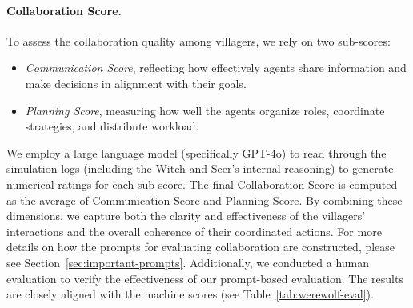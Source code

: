 \paragraph{Collaboration Score.}
To assess the collaboration quality among villagers, we rely on two sub-scores:
\begin{itemize}
    \item \emph{Communication Score}, reflecting how effectively agents share information and make decisions in alignment with their goals.
    \item \emph{Planning Score}, measuring how well the agents organize roles, coordinate strategies, and distribute workload.
\end{itemize}
We employ a large language model (specifically GPT-4o) to read through the simulation logs 
(including the Witch and Seer’s internal reasoning) to generate numerical ratings 
for each sub-score. The final Collaboration Score is computed as the average 
of Communication Score and Planning Score. By combining these dimensions, 
we capture both the clarity and effectiveness of the villagers’ interactions 
and the overall coherence of their coordinated actions.
For more details on how the prompts for evaluating collaboration are constructed,
please see Section~\ref{sec:important-prompts}.
Additionally, we conducted a human evaluation to verify the effectiveness of our prompt-based evaluation. The results are closely aligned with the machine scores (see Table~\ref{tab:werewolf-eval}).


